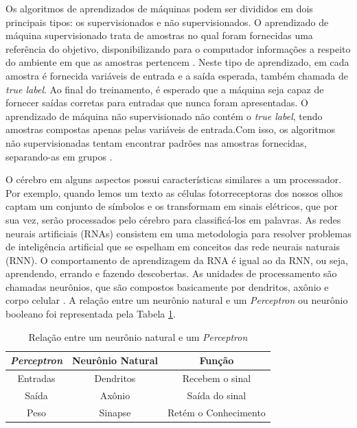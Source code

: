 \documentclass[conference]{IEEEtran}
\begin{document}
Os algoritmos de aprendizados de máquinas podem ser divididos em dois principais tipos: os supervisionados e não supervisionados. O aprendizado de máquina supervisionado trata de amostras no qual foram fornecidas uma referência do objetivo, disponibilizando para o computador informações a respeito do ambiente em que as amostras pertencem \cite{marr2017}. Neste tipo de aprendizado, em cada amostra é fornecida variáveis de entrada e a saída esperada, também chamada de \textit{true label}. Ao final do treinamento, é esperado que a máquina seja capaz de fornecer saídas corretas para entradas que nunca foram apresentadas. O aprendizado de máquina não supervisionado não contém o \textit{true label}, tendo amostras compostas apenas pelas variáveis de entrada.Com isso, os algoritmos não supervisionadas tentam encontrar padrões nas amostras fornecidas, separando-as em grupos \cite{marr2017}.


O cérebro em alguns aspectos possui características similares a um processador. Por exemplo, quando lemos um texto as células fotorreceptoras dos nossos olhos captam um conjunto de símbolos e os transformam em sinais elétricos, que por sua vez, serão processados pelo cérebro para classificá-los em palavras. As redes neurais artificiais (RNAs) consistem em uma metodologia para resolver problemas de inteligência artificial que se espelham em conceitos das rede neurais naturais (RNN). O comportamento de aprendizagem da RNA é igual ao da RNN, ou seja, aprendendo, errando e fazendo descobertas. As unidades de processamento são chamadas neurônios, que são compostos basicamente por dendritos, axônio e corpo celular \cite{kovacs96}. A relação entre um neurônio natural e um \textit{Perceptron} ou neurônio booleano foi representada pela Tabela \ref{table:tabelaComparativaNeuronioPerceptron}.

\renewcommand\tablename{TABELA}
\begin{table}[!h]
	\renewcommand{\arraystretch}{1.3}
	\caption{Relação entre um neurônio natural e um \textit{Perceptron}}
	\label{table:tabelaComparativaNeuronioPerceptron}
	\centering
	\begin{tabular}{|c|c|c|}
		\hline
		\textbf{\textit{Perceptron}} & \textbf{Neurônio Natural} & \textbf{Função}\\
		\hline
		Entradas & Dendritos & Recebem o sinal \\		
		\hline
		Saída & Axônio & Saída do sinal \\		
		\hline
		Peso & Sinapse & Retém o Conhecimento \\		
		\hline
	\end{tabular}
\end{table}
\end{document}
